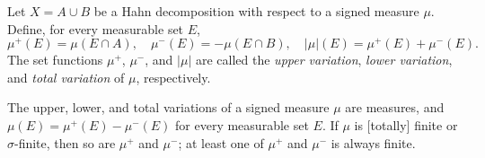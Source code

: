 Let $X = A \cup B$ be a Hahn decomposition with respect to a signed measure $\mu$. Define, for every measurable set $E$,
$$\mu^{+}(E) = \mu(E \cap A), \quad \mu^{-}(E) = -\mu(E \cap B), \quad |\mu|(E) = \mu^{+}(E) + \mu^{-}(E).$$
The set functions $\mu^{+}$, $\mu^{-}$, and $|\mu|$ are called the \textit{upper variation}, \textit{lower variation}, and \textit{total variation} of $\mu$, respectively.

The upper, lower, and total variations of a signed measure $\mu$ are measures, and $\mu(E) = \mu^{+}(E) - \mu^{-}(E)$ for every measurable set $E$. If $\mu$ is [totally] finite or $\sigma$-finite, then so are $\mu^{+}$ and $\mu^{-}$; at least one of $\mu^{+}$ and $\mu^{-}$ is always finite.
